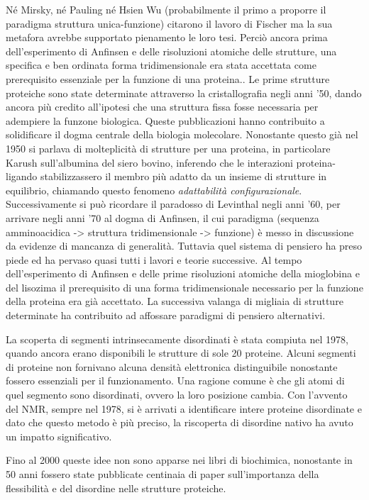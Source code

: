 {Né Mirsky, né Pauling né Hsien Wu (probabilmente il primo a proporre il paradigma struttura unica-funzione) citarono il lavoro di Fischer ma la sua metafora avrebbe supportato pienamento le loro tesi. Perciò ancora prima dell'esperimento di Anfinsen e delle risoluzioni atomiche delle strutture, una specifica e ben ordinata forma tridimensionale era stata accettata come prerequisito essenziale per la funzione di una proteina.\supercite{dunker2001intrinsically}. Le prime strutture proteiche sono state determinate attraverso la cristallografia negli anni '50, dando ancora più credito all'ipotesi che una struttura fissa fosse necessaria per adempiere la funzone biologica. Queste pubblicazioni hanno contribuito a solidificare il dogma centrale della biologia molecolare. Nonostante questo già nel 1950 si parlava di molteplicità di strutture per una proteina, in particolare Karush\supercite{karush1950heterogeneity} sull'albumina del siero bovino, inferendo che le interazioni proteina-ligando stabilizzassero il membro più adatto da un insieme di strutture in equilibrio, chiamando questo fenomeno \textit{adattabilità configurazionale}. Successivamente si può ricordare il paradosso di Levinthal negli anni '60, per arrivare negli anni '70 al dogma di Anfinsen, il cui paradigma (sequenza amminoacidica -> struttura tridimensionale -> funzione) è messo in discussione da evidenze di mancanza di generalità. Tuttavia quel sistema di pensiero ha preso piede ed ha pervaso quasi tutti i lavori e teorie successive. Al tempo dell'esperimento di Anfinsen e delle prime risoluzioni atomiche della mioglobina e del lisozima il prerequisito di una forma tridimensionale necessario per la funzione della proteina era già accettato. La successiva valanga di migliaia di strutture determinate ha contribuito ad affossare paradigmi di pensiero alternativi.

\par La scoperta di segmenti intrinsecamente disordinati è stata compiuta nel 1978, quando ancora erano disponibili le strutture di sole 20 proteine. Alcuni segmenti di proteine non fornivano alcuna densità elettronica distinguibile nonostante fossero essenziali per il funzionamento. Una  ragione comune è che gli atomi di quel segmento sono disordinati, ovvero la loro posizione cambia. Con l'avvento del NMR, sempre nel 1978, si è arrivati a identificare intere proteine disordinate e dato che questo metodo è più preciso, la riscoperta di disordine nativo ha avuto un impatto significativo.

\par Fino al 2000\supercite{bracken2000disorder} queste idee non sono apparse nei libri di biochimica, nonostante in 50 anni fossero state pubblicate centinaia di paper sull'importanza della flessibilità e del disordine nelle strutture proteiche.

}
